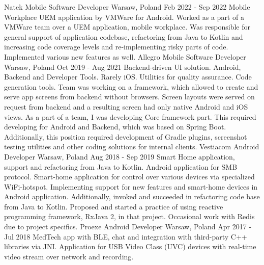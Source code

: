 
%
%
\cvexperience
  {Natek}
  {Mobile Software Developer}
  {Warsaw, Poland}
  {Feb 2022 - Sep 2022}
  {
    Mobile Workplace UEM application by VMWare for Android.
  }
  {
    Worked as a part of a VMWare team over a UEM application, mobile workplace. 
    \newline
    Was responsible for general support of application codebase, refactoring from Java to Kotlin and
    increasing code coverage levels and re-implementing risky parts of code.
    Implemented various new features as well.
  }
\cvexperience
  {Allegro}
  {Mobile Software Developer}
  {Warsaw, Poland}
  {Oct 2019 - Aug 2021}
  {
    Backend-driven UI solution. Android, Backend and Developer Tools. Rarely iOS.
    \newline
    Utilities for quality assurance. Code generation tools.
  }
  {
    Team was working on a framework, which allowed to create and serve app screens from backend without browsers.
    \newline
    Screen layouts were served on request from backend and a resulting screen had only native Android and iOS views.
    \newline
    As a part of a team, I was developing Core framework part.
    This required developing for Android and Backend, which was based on Spring Boot.
    Additionally, this position required development of Gradle plugins, screenshot testing utilities and
    other coding solutions for internal clients.
  }
\cvexperience
  {Vestiacom}
  {Android Developer}
  {Warsaw, Poland}
  {Aug 2018 - Sep 2019}
  {
    Smart Home application, support and refactoring from Java to Kotlin.
    \newline
    Android application for SMB protocol.
  }
  {
    Smart-home application for control over various devices via specialized WiFi-hotspot.
    Implementing support for new features and smart-home devices in Android application.
    Additionally, invoked and succeeded in refactoring code base from Java to Kotlin.
    \newline
    Proposed and started a practice of using reactive programming framework, RxJava 2, in that project.
    Occasional work with Redis due to project specifics.
  }
\cvexperience
  {Proexe}
  {Android Developer}
  {Warsaw, Poland}
  {Apr 2017 - Jul 2018}
  {
    MedTech app with BLE, chat and integration with third-party C++ libraries via JNI.
    \newline
    Application for USB Video Class (UVC) devices with real-time video stream over network and recording.
  }
